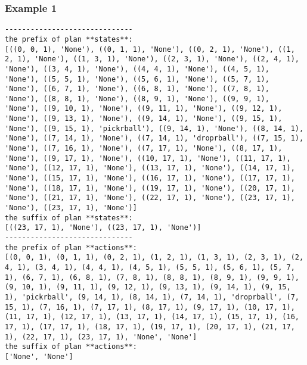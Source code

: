 \subsubsection*{Example 1}
\begin{lstlisting}
------------------------------
the prefix of plan **states**:
[((0, 0, 1), 'None'), ((0, 1, 1), 'None'), ((0, 2, 1), 'None'), ((1, 2, 1), 'None'), ((1, 3, 1), 'None'), ((2, 3, 1), 'None'), ((2, 4, 1), 'None'), ((3, 4, 1), 'None'), ((4, 4, 1), 'None'), ((4, 5, 1), 'None'), ((5, 5, 1), 'None'), ((5, 6, 1), 'None'), ((5, 7, 1), 'None'), ((6, 7, 1), 'None'), ((6, 8, 1), 'None'), ((7, 8, 1), 'None'), ((8, 8, 1), 'None'), ((8, 9, 1), 'None'), ((9, 9, 1), 'None'), ((9, 10, 1), 'None'), ((9, 11, 1), 'None'), ((9, 12, 1), 'None'), ((9, 13, 1), 'None'), ((9, 14, 1), 'None'), ((9, 15, 1), 'None'), ((9, 15, 1), 'pickrball'), ((9, 14, 1), 'None'), ((8, 14, 1), 'None'), ((7, 14, 1), 'None'), ((7, 14, 1), 'droprball'), ((7, 15, 1), 'None'), ((7, 16, 1), 'None'), ((7, 17, 1), 'None'), ((8, 17, 1), 'None'), ((9, 17, 1), 'None'), ((10, 17, 1), 'None'), ((11, 17, 1), 'None'), ((12, 17, 1), 'None'), ((13, 17, 1), 'None'), ((14, 17, 1), 'None'), ((15, 17, 1), 'None'), ((16, 17, 1), 'None'), ((17, 17, 1), 'None'), ((18, 17, 1), 'None'), ((19, 17, 1), 'None'), ((20, 17, 1), 'None'), ((21, 17, 1), 'None'), ((22, 17, 1), 'None'), ((23, 17, 1), 'None'), ((23, 17, 1), 'None')]
the suffix of plan **states**:
[((23, 17, 1), 'None'), ((23, 17, 1), 'None')]
------------------------------
the prefix of plan **actions**:
[(0, 0, 1), (0, 1, 1), (0, 2, 1), (1, 2, 1), (1, 3, 1), (2, 3, 1), (2, 4, 1), (3, 4, 1), (4, 4, 1), (4, 5, 1), (5, 5, 1), (5, 6, 1), (5, 7, 1), (6, 7, 1), (6, 8, 1), (7, 8, 1), (8, 8, 1), (8, 9, 1), (9, 9, 1), (9, 10, 1), (9, 11, 1), (9, 12, 1), (9, 13, 1), (9, 14, 1), (9, 15, 1), 'pickrball', (9, 14, 1), (8, 14, 1), (7, 14, 1), 'droprball', (7, 15, 1), (7, 16, 1), (7, 17, 1), (8, 17, 1), (9, 17, 1), (10, 17, 1), (11, 17, 1), (12, 17, 1), (13, 17, 1), (14, 17, 1), (15, 17, 1), (16, 17, 1), (17, 17, 1), (18, 17, 1), (19, 17, 1), (20, 17, 1), (21, 17, 1), (22, 17, 1), (23, 17, 1), 'None', 'None']
the suffix of plan **actions**:
['None', 'None']
\end{lstlisting}



